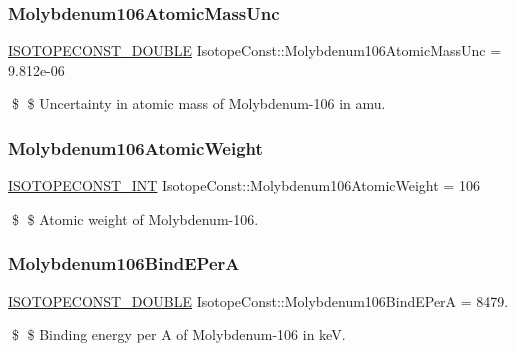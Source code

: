 \subsubsection{\texorpdfstring{Molybdenum106\+Atomic\+Mass\+Unc}{Molybdenum106AtomicMassUnc}}
{\footnotesize\ttfamily \mbox{\hyperlink{group___isotope_const-_macros_ga8f45a7272ce02c0b4c65c44636ed719a}{I\+S\+O\+T\+O\+P\+E\+C\+O\+N\+S\+T\+\_\+\+D\+O\+U\+B\+LE}} Isotope\+Const\+::\+Molybdenum106\+Atomic\+Mass\+Unc = 9.\+812e-\/06}

\$ \$ Uncertainty in atomic mass of Molybdenum-\/106 in amu. \mbox{\label{group___isotope_const-_molybdenum-_mo106_ga99a3e82ac609f301d9410e3c2fbec28f}} 
\subsubsection{\texorpdfstring{Molybdenum106\+Atomic\+Weight}{Molybdenum106AtomicWeight}}
{\footnotesize\ttfamily \mbox{\hyperlink{group___isotope_const-_macros_ga5f18360b3e99483a35c32d789e62621c}{I\+S\+O\+T\+O\+P\+E\+C\+O\+N\+S\+T\+\_\+\+I\+NT}} Isotope\+Const\+::\+Molybdenum106\+Atomic\+Weight = 106}

\$ \$ Atomic weight of Molybdenum-\/106. \mbox{\label{group___isotope_const-_molybdenum-_mo106_gaef559462a47aec1d39e90cae085280f0}} 
\subsubsection{\texorpdfstring{Molybdenum106\+Bind\+E\+PerA}{Molybdenum106BindEPerA}}
{\footnotesize\ttfamily \mbox{\hyperlink{group___isotope_const-_macros_ga8f45a7272ce02c0b4c65c44636ed719a}{I\+S\+O\+T\+O\+P\+E\+C\+O\+N\+S\+T\+\_\+\+D\+O\+U\+B\+LE}} Isotope\+Const\+::\+Molybdenum106\+Bind\+E\+PerA = 8479.}

\$ \$ Binding energy per A of Molybdenum-\/106 in keV. \mbox{\label{group___isotope_const-_molybdenum-_mo106_gaf387198ad32107542f5d04e9985bac4a}} 
